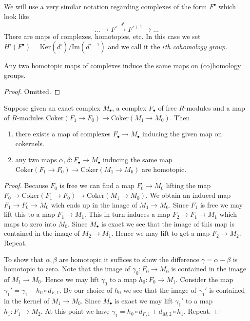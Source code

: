 \medskip\noindent
We will use a very similar notation regarding complexes
of the form $F^{\bullet}$ which look like
$$
\ldots \to F^i \xrightarrow{d^i} F^{i+1} \to \ldots
$$
There are maps of complexes, homotopies, etc.
In this case we set $H^i(F^{\bullet}) =
\text{Ker}(d^i)/\text{Im}(d^{i - 1})$ and we call it
the {\it $i$th cohomology group}.

\begin{lemma}
\label{lemma-homotopic-equal-homology}
Any two homotopic maps of complexes induce the same maps on
(co)homology groups.
\end{lemma}

\begin{proof}
Omitted.
\end{proof}

\begin{lemma}
\label{lemma-compare-resolutions}
Suppose given an exact complex $M_{\bullet}$, a complex
$F_{\bullet}$ of free $R$-modules and a map
of $R$-modules $\text{Coker}(F_1 \to F_0) \to \text{Coker}(M_1 \to M_0)$. 
Then
\begin{enumerate}
\item there exists a map of complexes $F_{\bullet}
\to M_{\bullet}$ inducing the given map on cokernels.
\item any two maps $\alpha, \beta : F_{\bullet}
\to M_{\bullet}$ inducing the same map 
$\text{Coker}(F_1 \to F_0) \to \text{Coker}(M_1 \to M_0)$
are homotopic.
\end{enumerate}
\end{lemma}

\begin{proof}
Because $F_0$ is free we can find a map $F_0 \to M_0$
lifting the map $F_0 \to \text{Coker}(F_1 \to F_0)
\to \text{Coker}(M_1 \to M_0)$. We obtain an induced
map $F_1 \to F_0 \to M_0$ wich ends up in the image
of $M_1 \to M_0$. Since $F_1$ is free we may lift this
to a map $F_1 \to M_1$. This in turn induces a map
$F_2 \to F_1 \to M_1$ which maps to zero into
$M_0$. Since $M_{\bullet}$ is exact we see that
the image of this map is contained in the image
of $M_2 \to M_1$. Hence we may lift to get a map
$F_2 \to M_2$. Repeat.

\medskip\noindent
To show that $\alpha, \beta$ are homotopic it suffices
to show the difference $\gamma = \alpha - \beta$ is homotopic
to zero. Note that the image of $\gamma_0 : F_0 \to M_0$
is contained in the image of $M_1 \to M_0$. Hence we may lift
$\gamma_0$ to a map $h_0 : F_0 \to M_1$. Consider the map
$\gamma_1' = \gamma_1 - h_0 \circ d_{F, 1}$. By our choice of $h_0$
we see that the image of $\gamma_1'$ is contained in
the kernel of $M_1 \to M_0$. Since $M_{\bullet}$ is exact 
we may lift $\gamma_1'$ to a map $h_1 : F_1 \to M_2$.
At this point we have $\gamma_1 = h_0 \circ d_{F, 1}
+ d_{M, 2} \circ h_1$. Repeat.
\end{proof}


